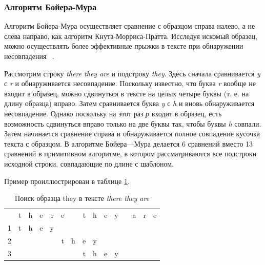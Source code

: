 \documentclass[a4paper,12pt]{article}
\begin{document}
\subsubsection{Алгоритм Бойера-Мура}

Алгоритм Бойера-Мура осуществляет сравнение с образцом справа налево,
а не слева направо, как алгоритм Кнута-Морриса-Пратта.
Исследуя искомый образец, можно осуществлять более эффективные прыжки в тексте при обнаружении несовпадения ~\cite{mcconell}.

Рассмотрим строку \textit{there they are} и подстроку \textit{they}.
Здесь сначала сравнивается \textit{y} с \textit{r} и обнаруживается несовпадение.
Поскольку известно, что буква \textit{r} вообще не входит в образец,
можно сдвинуться в тексте на целых четыре буквы (т. е. на длину образца)
вправо. Затем сравнивается буква \textit{y} с \textit{h} и вновь обнаруживается
несовпадение. Однако поскольку на этот раз \textit{р} входит в образец,
есть возможность сдвинуться вправо только на две буквы так, чтобы буквы
\textit{h} совпали.
Затем начинается сравнение справа и обнаруживается полное совпадение кусочка текста с 
образцом. В алгоритме Бойера—Мура делается 6
сравнений вместо 13 сравнений в примитивном алгоритме, в котором
рассматриваются все подстроки исходной строки, совпадающие по длине
с шаблоном.

Пример проиллюстрирован в таблице \ref{bm_example}.

\begin{table} [h!]
	\begin{center}
		\caption{Поиск образца they в тексте \textit{there they are}}
		\begin{tabular}{r|rrrrrrrrrrrrrr|}
			
			&          t &          h &          e &          r &          e &            &          t &          h &          e &          y &            &          a &          r &          e \\
			
			1 &          t &          h &          e &          y &            &            &            &            &            &            &            &            &            &            \\
			
			2 &            &            &            &            &          t &          h &          e &          y &            &            &            &            &            &            \\
			
			3 &            &            &            &            &            &            &          t &          h &          e &          y &            &            &            &            \\
			
		\end{tabular}
		
		\label{bm_example}
	\end{center}
\end{table} 
\end{document}
